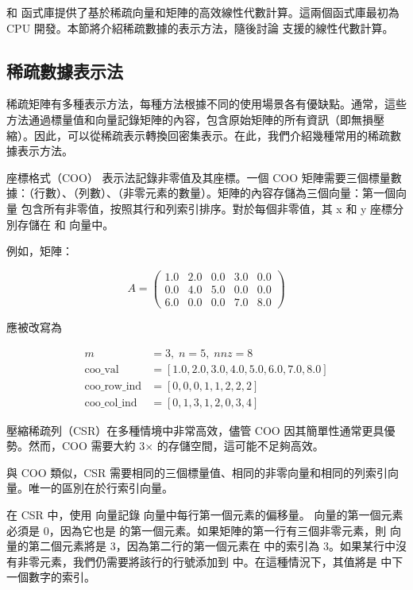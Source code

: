  和  函式庫提供了基於稀疏向量和矩陣的高效線性代數計算。這兩個函式庫最初為 CPU 開發。本節將介紹稀疏數據的表示方法，隨後討論  支援的線性代數計算。

\subsection{稀疏數據表示法}
稀疏矩陣有多種表示方法，每種方法根據不同的使用場景各有優缺點。通常，這些方法通過標量值和向量記錄矩陣的內容，包含原始矩陣的所有資訊（即無損壓縮）。因此，可以從稀疏表示轉換回密集表示。在此，我們介紹幾種常用的稀疏數據表示方法。

座標格式（COO） 表示法記錄非零值及其座標。一個 COO 矩陣需要三個標量數據：（行數）、（列數）、（非零元素的數量）。矩陣的內容存儲為三個向量：第一個向量  包含所有非零值，按照其行和列索引排序。對於每個非零值，其 x 和 y 座標分別存儲在  和  向量中。

例如，矩陣：

\[
A = \begin{pmatrix} \tag{9.1}
1.0 & 2.0 & 0.0 & 3.0 & 0.0 \\
0.0 & 4.0 & 5.0 & 0.0 & 0.0 \\
6.0 & 0.0 & 0.0 & 7.0 & 8.0
\end{pmatrix}
\]

應被改寫為

\[
\begin{aligned} 
m &= 3, \; n = 5, \; nnz = 8 \\
\text{coo\_val} &= [1.0, 2.0, 3.0, 4.0, 5.0, 6.0, 7.0, 8.0] \\
\text{coo\_row\_ind} &= [0, 0, 0, 1, 1, 2, 2, 2] \\
\text{coo\_col\_ind} &= [0, 1, 3, 1, 2, 0, 3, 4]
\end{aligned} \tag{9.2}
\]

壓縮稀疏列（CSR）在多種情境中非常高效，儘管 COO 因其簡單性通常更具優勢。然而，COO 需要大約 3× 的存儲空間，這可能不足夠高效。

與 COO 類似，CSR 需要相同的三個標量值、相同的非零向量和相同的列索引向量。唯一的區別在於行索引向量。

在 CSR 中，使用  向量記錄  向量中每行第一個元素的偏移量。 向量的第一個元素必須是 0，因為它也是  的第一個元素。如果矩陣的第一行有三個非零元素，則  向量的第二個元素將是 3，因為第二行的第一個元素在  中的索引為 3。如果某行中沒有非零元素，我們仍需要將該行的行號添加到  中。在這種情況下，其值將是  中下一個數字的索引。

